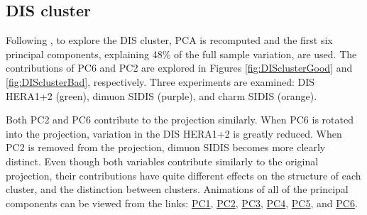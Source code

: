 \hypertarget{dis-cluster}{%
\subsection{DIS cluster}\label{dis-cluster}}

Following \citet{cook_dynamical_2018}, to explore the DIS cluster, PCA
is recomputed and the first six principal components, explaining 48\% of
the full sample variation, are used. The contributions of PC6 and PC2
are explored in Figures \ref{fig:DISclusterGood} and
\ref{fig:DISclusterBad}, respectively. Three experiments are examined:
DIS HERA1+2 (green), dimuon SIDIS (purple), and charm SIDIS (orange).

Both PC2 and PC6 contribute to the projection similarly. When PC6 is
rotated into the projection, variation in the DIS HERA1+2 is greatly
reduced. When PC2 is removed from the projection, dimuon SIDIS becomes
more clearly distinct. Even though both variables contribute similarly
to the original projection, their contributions have quite different
effects on the structure of each cluster, and the distinction between
clusters. Animations of all of the principal components can be viewed
from the links:
\href{https://nspyrison.netlify.com/thesis/discluster_manualtour_pc1/}{PC1},
\href{https://nspyrison.netlify.com/thesis/discluster_manualtour_pc2/}{PC2},
\href{https://nspyrison.netlify.com/thesis/discluster_manualtour_pc3/}{PC3},
\href{https://nspyrison.netlify.com/thesis/discluster_manualtour_pc4/}{PC4},
\href{https://nspyrison.netlify.com/thesis/discluster_manualtour_pc5/}{PC5},
and
\href{https://nspyrison.netlify.com/thesis/discluster_manualtour_pc6/}{PC6}.

